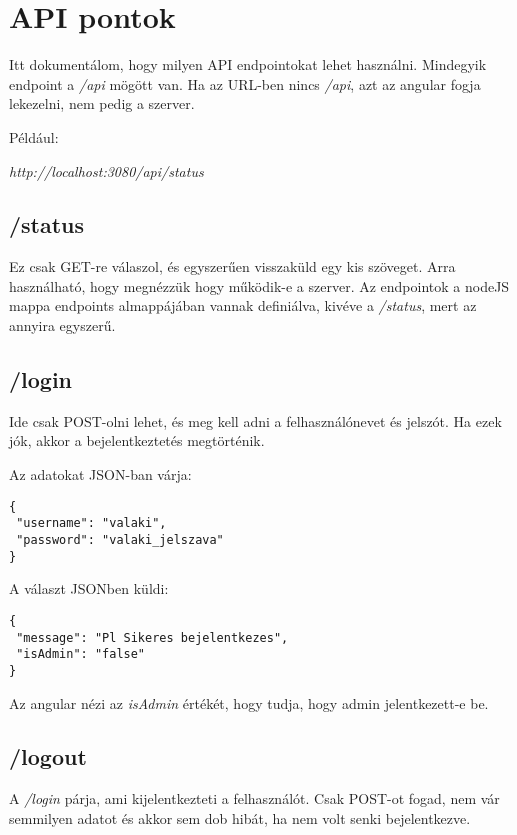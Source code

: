 \documentclass[]{article}
\begin{document}
\section{API pontok}

Itt dokumentálom, hogy milyen API endpointokat lehet használni. Mindegyik endpoint a \textit{/api} mögött van. Ha az URL-ben nincs \textit{/api}, azt az angular fogja lekezelni, nem pedig a szerver.

Például:

\bigskip
\begin{center}
	\textit{http://localhost:3080/api/status}
\end{center}

\subsection{/status}

Ez csak GET-re válaszol, és egyszerűen visszaküld egy kis szöveget. Arra használható, hogy megnézzük hogy működik-e a szerver. Az endpointok a nodeJS mappa endpoints almappájában vannak definiálva, kivéve a \textit{/status}, mert az annyira egyszerű.

\subsection{/login}

Ide csak POST-olni lehet, és meg kell adni a felhasználónevet és jelszót. Ha ezek jók, akkor a bejelentkeztetés megtörténik.

\noindent
Az adatokat JSON-ban várja:

\bigskip
\begin{lstlisting}
{
 "username": "valaki",
 "password": "valaki_jelszava"
}
\end{lstlisting}

\noindent
A választ JSONben küldi:

\bigskip
\begin{lstlisting}
{
 "message": "Pl Sikeres bejelentkezes",
 "isAdmin": "false"
}
\end{lstlisting}

\noindent
Az angular nézi az \textit{isAdmin} értékét, hogy tudja, hogy admin jelentkezett-e be.

\subsection{/logout}

A \textit{/login} párja, ami kijelentkezteti a felhasználót. Csak POST-ot fogad, nem vár semmilyen adatot és akkor sem dob hibát, ha nem volt senki bejelentkezve.
\end{document}
